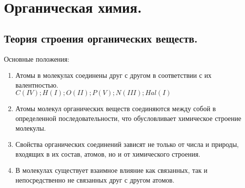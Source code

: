 \documentclass{article}
\begin{document}
	\tableofcontents
	\setcounter{tocdepth}{3}
	\newpage
	\section{Органическая химия.}
	\subsection{Теория строения органических веществ.}
	\begin{definition}
		Основные положения:
		\begin{enumerate}
			\item Атомы в молекулах соединены друг с другом в соответствии с их валентностью. \\
			$C (IV); H (I); O (II); P (V); N (III); Hal (I)$
			\item Атомы молекул органических веществ соединяются между собой в определенной последовательности, что обусловливает химическое строение молекулы.
			\item Свойства органических соединений зависят не только от числа и природы, входящих в их состав, атомов, но и от химического строения.
			\item В молекулах существует взаимное влияние как связанных, так и непосредственно не связанных друг с другом атомов.
		\end{enumerate}
	\end{definition}
\end{document}
